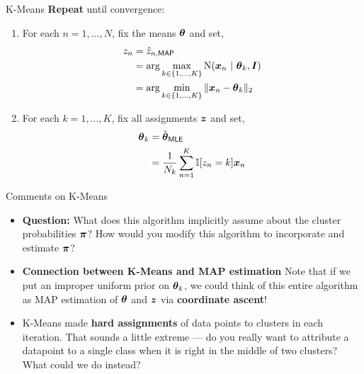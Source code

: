 \documentclass[aspectratio=169]{beamer}
\begin{document}
\begin{frame}[t, allowframebreaks]{K-Means}\label{map-inference-and-k-means}
\textbf{Repeat} until convergence: 

\begin{enumerate}
    \item For each \(n=1,\ldots, N\), fix the means \(\boldsymbol{\theta}\) and set,
    \begin{align*}
        z_n &= \hat{z}_{n,\mathsf{MAP}} \\
        &= \arg \max_{k \in \{1,\ldots,K\}} \mathrm{N}(\boldsymbol{x}_n ~\vert~ \boldsymbol{\theta}_k, \boldsymbol{I}) \\
        &= \arg \min_{k \in \{1,\ldots, K\}} \|\boldsymbol{x}_n - \boldsymbol{\theta}_k\|_2
    \end{align*}
    
    \item For each \(k=1,\ldots,K\), fix all assignments \(\boldsymbol{z}\) and set,
    \begin{align*}
       \boldsymbol{\theta}_k &= \hat{\boldsymbol{\theta}}_{\mathsf{MLE}} \\
       &= \frac{1}{N_k} \sum_{n=1}^K \mathbb{I}[z_n=k] \boldsymbol{x}_n
    \end{align*}
\end{enumerate}
\end{frame}

\begin{frame}[t]{Comments on K-Means}

\begin{itemize}    
    \item \textbf{Question:} What does this algorithm implicitly assume
about the cluster probabilities \(\boldsymbol{\pi}\)? How would you modify this
algorithm to incorporate and estimate \(\boldsymbol{\pi}\)?

\item \textbf{Connection between K-Means and MAP estimation} 
Note that if we put an improper uniform prior on \(\boldsymbol{\theta}_k\), we could
think of this entire algorithm as MAP estimation of \(\boldsymbol{\theta}\) and
\(\boldsymbol{z}\) via \textbf{coordinate ascent}! 

\item K-Means made \textbf{hard assignments} of data points to clusters in
each iteration. That sounds a little extreme --- do you really want to
attribute a datapoint to a single class when it is right in the middle
of two clusters? What could we do instead?
\end{itemize}

\end{frame}
\end{document}
